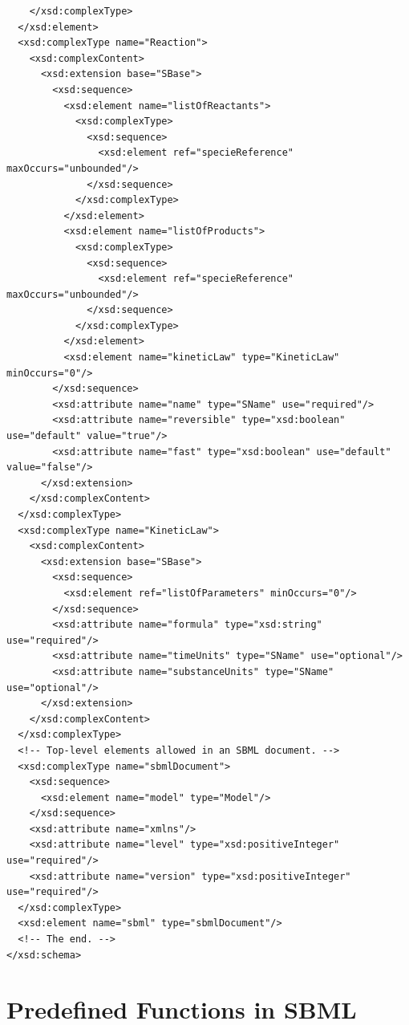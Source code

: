\documentclass[10pt]{cekarticle}
\begin{document}
\begin{small}
\begin{verbatim}
    </xsd:complexType>
  </xsd:element>
  <xsd:complexType name="Reaction">
    <xsd:complexContent>
      <xsd:extension base="SBase">
        <xsd:sequence>
          <xsd:element name="listOfReactants">
            <xsd:complexType>
              <xsd:sequence>
                <xsd:element ref="specieReference" maxOccurs="unbounded"/>
              </xsd:sequence>
            </xsd:complexType>
          </xsd:element>
          <xsd:element name="listOfProducts">
            <xsd:complexType>
              <xsd:sequence>
                <xsd:element ref="specieReference" maxOccurs="unbounded"/>
              </xsd:sequence>
            </xsd:complexType>
          </xsd:element>
          <xsd:element name="kineticLaw" type="KineticLaw" minOccurs="0"/>
        </xsd:sequence>
        <xsd:attribute name="name" type="SName" use="required"/>
        <xsd:attribute name="reversible" type="xsd:boolean" use="default" value="true"/>
        <xsd:attribute name="fast" type="xsd:boolean" use="default" value="false"/>
      </xsd:extension>
    </xsd:complexContent>
  </xsd:complexType>
  <xsd:complexType name="KineticLaw">
    <xsd:complexContent>
      <xsd:extension base="SBase">
        <xsd:sequence>
          <xsd:element ref="listOfParameters" minOccurs="0"/>
        </xsd:sequence>
        <xsd:attribute name="formula" type="xsd:string" use="required"/>
        <xsd:attribute name="timeUnits" type="SName" use="optional"/>
        <xsd:attribute name="substanceUnits" type="SName" use="optional"/>
      </xsd:extension>
    </xsd:complexContent>
  </xsd:complexType>
  <!-- Top-level elements allowed in an SBML document. -->
  <xsd:complexType name="sbmlDocument">
    <xsd:sequence>
      <xsd:element name="model" type="Model"/>
    </xsd:sequence>
    <xsd:attribute name="xmlns"/>
    <xsd:attribute name="level" type="xsd:positiveInteger" use="required"/>
    <xsd:attribute name="version" type="xsd:positiveInteger" use="required"/>
  </xsd:complexType>
  <xsd:element name="sbml" type="sbmlDocument"/>
  <!-- The end. -->
</xsd:schema>
\end{verbatim}
\regularspacing
\end{small}


\newpage

\section{Predefined Functions in SBML}
\label{apdx:predefined-functions}
\end{document}
